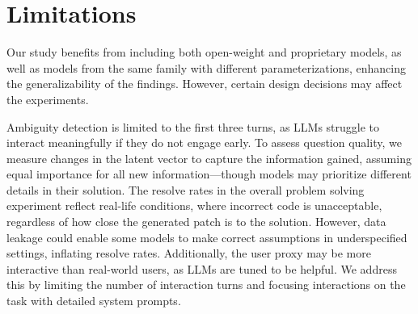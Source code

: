 \section{Limitations}
\label{sec:Limitations}
Our study benefits from including both open-weight and proprietary models, as well as models from the same family with different parameterizations, enhancing the generalizability of the findings. However, certain design decisions may affect the experiments.

Ambiguity detection is limited to the first three turns, as LLMs struggle to interact meaningfully if they do not engage early. To assess question quality, we measure changes in the latent vector to capture the information gained, assuming equal importance for all new information—though models may prioritize different details in their solution. The resolve rates in the overall problem solving experiment reflect real-life conditions, where incorrect code is unacceptable, regardless of how close the generated patch is to the solution. However, data leakage could enable some models to make correct assumptions in underspecified settings, inflating resolve rates. Additionally, the user proxy may be more interactive than real-world users, as LLMs are tuned to be helpful. We address this by limiting the number of interaction turns and focusing interactions on the task with detailed system prompts.


